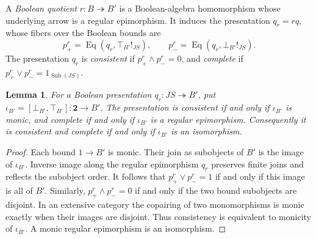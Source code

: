 \documentclass[11pt]{article}
\newtheorem{lemma}[theorem]{Lemma}
\theoremstyle{definition}
\theoremstyle{remark}
\begin{document}
A \emph{Boolean quotient} $r:B\twoheadrightarrow B'$ is a Boolean-algebra
homomorphism whose underlying arrow is a regular epimorphism.
It induces the presentation $q_r=rq$, whose fibers over the Boolean bounds are
\[
 p^r_+=\operatorname{Eq}(q_r,\top_{B'}!_{JS}),\qquad
 p^r_-=\operatorname{Eq}(q_r,\bot_{B'}!_{JS}).
\]
The presentation $q_r$ is \emph{consistent} if
$p^r_+\wedge p^r_-=0$, and \emph{complete} if
$p^r_+\vee p^r_-=1_{\operatorname{Sub}(JS)}$.

\begin{lemma}\label{lem:complete-boolean-presentation}
For a Boolean presentation $q_r:JS\twoheadrightarrow B'$, put
$\iota_{B'}=[\bot_{B'},\top_{B'}]:\mathbf2\to B'$.
The presentation is consistent if and only if $\iota_{B'}$ is
monic, and complete if and only if $\iota_{B'}$ is a regular
epimorphism. Consequently it is consistent and complete if and
only if $\iota_{B'}$ is an isomorphism.
\end{lemma}
\begin{proof}
Each bound $1\to B'$ is monic. Their join as subobjects of $B'$
is the image of $\iota_{B'}$.
Inverse image along the regular epimorphism $q_r$ preserves finite
joins and reflects the subobject order. It follows that
$p^r_+\vee p^r_-=1$ if and only if this image is all of $B'$.
Similarly, $p^r_+\wedge p^r_-=0$ if and only if the two bound
subobjects are disjoint. In an extensive category the copairing
of two monomorphisms is monic exactly when their images are
disjoint. Thus consistency is equivalent to monicity of
$\iota_{B'}$. A monic regular epimorphism is an isomorphism.
\end{proof}
\end{document}
